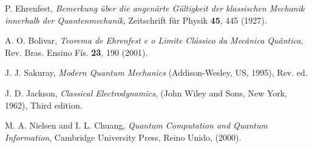 \documentclass[twocolumn]{rbef}
\newcommand{\1}{\mathbbm{1}}
\begin{document}
\begin{thebibliography}{99}
 P. Ehrenfest, \textit{Bemerkung über die angenärte
    Gültigkeit der klassischen Mechanik innerhalb der Quantenmechanik},
  Zeitschrift für Physik \textbf{45}, 445 (1927).

 A. O. Bolivar, \textit{Teorema de Ehrenfest e o Limite
    Clássico da Mecânica Quântica}, Rev. Bras. Ensino Fís. \textbf{23},
  190 (2001).

 J. J. Sakuray, \textit{Modern Quantum Mechanics}
  (Addison-Wesley, US, 1995), Rev. ed.

 J. D. Jackson, \textit{Classical Electrodynamics},
  (John Wiley and Sons, New York, 1962), Third edition.

 M. A. Nielsen and I. L. Chuang, \textit{Quantum
    Computation and Quantum Information}, Cambridge University Press,
  Reino Unido, (2000).

\end{thebibliography}
\end{document}
